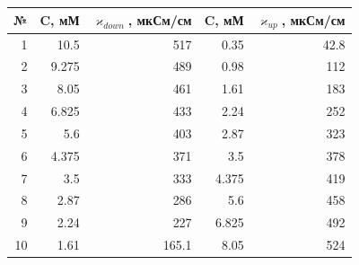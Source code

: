 \documentclass[a4paper,12pt]{article}
\begin{document}
\begin{table}[h!]
\centering
\begin{tabular}{|r|r|r|r|r|}
\hline
\multicolumn{1}{|l|}{№} & \multicolumn{1}{l|}{C, мМ} & \multicolumn{1}{l|}{$\varkappa_{down}$, мкСм/см} & \multicolumn{1}{l|}{C, мМ} & \multicolumn{1}{l|}{$\varkappa_{up}$, мкСм/см} \\ \hline
1                       & 10.5                       & 517                                              & 0.35                       & 42.8                                           \\ \hline
2                       & 9.275                      & 489                                              & 0.98                       & 112                                            \\ \hline
3                       & 8.05                       & 461                                              & 1.61                       & 183                                            \\ \hline
4                       & 6.825                      & 433                                              & 2.24                       & 252                                            \\ \hline
5                       & 5.6                        & 403                                              & 2.87                       & 323                                            \\ \hline
6                       & 4.375                      & 371                                              & 3.5                        & 378                                            \\ \hline
7                       & 3.5                        & 333                                              & 4.375                      & 419                                            \\ \hline
8                       & 2.87                       & 286                                              & 5.6                        & 458                                            \\ \hline
9                       & 2.24                       & 227                                              & 6.825                      & 492                                            \\ \hline
10                      & 1.61                       & 165.1                                            & 8.05                       & 524                                            \\ \hline

\end{tabular}
\end{table}
\end{document}
